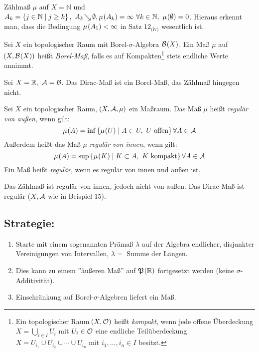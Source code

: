 \documentclass[skript.tex]{\mf{P}s}
\begin{document}
	\begin{bem}
		Zählmaß $\mu$ auf $X=\mathbb{N}$ und $A_k=\cbr{j\in\mathbb{N}\mid j \ge k},\ A_k \searr \emptyset,\\ \mu\pr{A_k}=\infty\ \forall k\in \mathbb{N},\ \mu\pr{\emptyset}=0$. Hieraus erkennt man, dass die Bedingung $\mu\pr{A_1}<\infty$ in \textup{Satz $12_{\text{(iv)}}$} wesentlich ist.
	\end{bem}

	\begin{defin}
		Sei $X$ ein topologischer Raum mit Borel-$\sigma$-Algebra $\mc{B}\pr{X}$. Ein Maß $\mu$ auf $\pr{X, \mc{B}\pr{X}}$ heißt \textit{Borel-Maß}, falls es auf Kompakten\footnote{Ein topologischer Raum $\pr{X,\mc{O}}$ heißt \textit{kompakt}, wenn jede offene Überdeckung $X=\bigcup_{i\in I}U_i$ mit $U_i \in \mathcal{O}$ eine endliche Teilüberdeckung $X=U_{i_1}\cup U_{i_2} \cup \dotsm \cup U_{i_n}$ mit $i_1,\dots,i_n \in I$ besitzt.} stets endliche Werte annimmt.
	\end{defin}
	
	\begin{bsp}
		Sei $X=\mathbb{R},\ \mathcal{A}=\mathcal{B}$. Das Dirac-Maß ist ein Borel-Maß, das Zählmaß hingegen nicht. 
	\end{bsp}

	\begin{defin}[Regularität]
		Sei $X$ ein topologischer Raum, $\pr{X,\mc{A}, \mu}$ ein Maßraum. Das Maß $\mu$ heißt \textit{regulär von außen}, wenn gilt:
			\begin{equation*}
				\mu\pr{A} = \inf\cbr{\mu\pr{U} \mid A \subset U,\ U \text{ offen} } \forall A \in \mc{A}
			\end{equation*}
		Außerdem heißt das Maß $\mu$ \textit{regulär von innen}, wenn gilt:
			\begin{equation*}
				\mu\pr{A} = \sup\cbr{\mu\pr{K} \mid K \subset A,\ K \text{ kompakt}} \forall A \in \mc{A}
			\end{equation*}
		Ein Maß heißt \textit{regulär}, wenn es regulär von innen und außen ist. 
	\end{defin}
	
	\begin{bsp}
		Das Zählmaß ist regulär von innen, jedoch nicht von außen. Das Dirac-Maß ist regulär ($X,\mathcal{A}$ wie in \textup{Beispiel 15}).
	\end{bsp}

	\subsection*{Strategie:}
	\begin{enumerate}
		\item Starte mit einem sogenannten Prämaß $\lambda$ auf der Algebra endlicher, disjunkter Vereinigungen von Intervallen, $\lambda=$ Summe der Längen.
		\item Dies kann zu einem ''äußeren Maß'' auf $\mf{P}\pr{\mathbb{R}}$ fortgesetzt werden (keine $\sigma$-Additivität).
		\item Einschränkung auf Borel-$\sigma$-Algebren liefert ein Maß.
	\end{enumerate}
\end{document}
